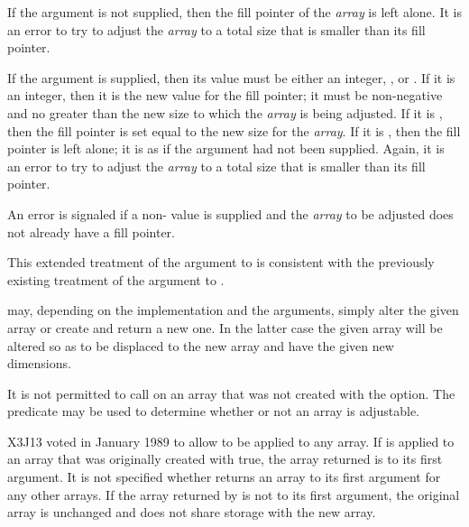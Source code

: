 \begin{defun}[Function]
\begin{new}
If the  argument is not supplied, then the fill pointer
of the {\it array} is left alone.  It is an error
to try to adjust the {\it array} to a total size that is smaller
than its fill pointer.

If the  argument is supplied, then its value
must be either an integer, \true, or \false.  If it is an integer,
then it is the new value for the fill pointer;
it must be non-negative and no greater than the new size to which the
{\it array} is being adjusted.
If it is \true, then the fill pointer is set equal to the new size
for the {\it array}.  If it is \false, then the fill pointer is
left alone; it is as if the argument had not been supplied.
Again, it is an error
to try to adjust the {\it array} to a total size that is smaller
than its fill pointer.

An error is signaled if a non-{\false}  value
is supplied and the {\it array} to be adjusted does not already
have a fill pointer.

This extended treatment of the 
argument to  is consistent with the previously
existing treatment of the  argument to .
\end{new}

 may, depending on the implementation and the arguments,
simply alter the given array or create and return a new one.
In the latter case the given array will be altered so as to be displaced
to the new array and have the given new dimensions.

\begin{obsolete}
It is not permitted to call  on an array that was not
created with the  option.  The predicate
 may be used to determine whether or not
an array is adjustable.
\end{obsolete}

\begin{newer}
X3J13 voted in January 1989
to allow  to be applied to any array.
If  is applied to an array that was
originally created with  true,
the array returned is  to its first argument.  It is not specified
whether  returns an array  to its first argument for any
other arrays.  If the array returned by  is not  to its
first argument, the original array is unchanged and does not share
storage with the new array.


\end{newer}
\end{defun}
